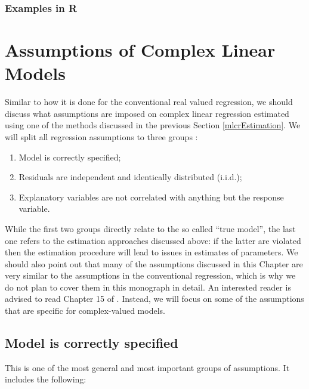 \documentclass[
]{book}
\providecommand{\tightlist}{%
  \setlength{\itemsep}{0pt}\setlength{\parskip}{0pt}}
\begin{document}
\hypertarget{examples-in-r-3}{%
\subsection{Examples in R}\label{examples-in-r-3}}

\hypertarget{assumptions-of-complex-linear-models}{%
\chapter{Assumptions of Complex Linear Models}\label{assumptions-of-complex-linear-models}}

Similar to how it is done for the conventional real valued regression, we should discuss what assumptions are imposed on complex linear regression estimated using one of the methods discussed in the previous Section \ref{mlcrEstimation}. We will split all regression assumptions to three groups \citep[similar to how it was done by][]{SvetunkovSBA}:

\begin{enumerate}
\def\labelenumi{\arabic{enumi}.}
\tightlist
\item
  Model is correctly specified;
\item
  Residuals are independent and identically distributed (i.i.d.);
\item
  Explanatory variables are not correlated with anything but the response variable.
\end{enumerate}

While the first two groups directly relate to the so called ``true model'', the last one refers to the estimation approaches discussed above: if the latter are violated then the estimation procedure will lead to issues in estimates of parameters. We should also point out that many of the assumptions discussed in this Chapter are very similar to the assumptions in the conventional regression, which is why we do not plan to cover them in this monograph in detail. An interested reader is advised to read Chapter 15 of \citet{SvetunkovSBA}. Instead, we will focus on some of the assumptions that are specific for complex-valued models.

\hypertarget{model-is-correctly-specified}{%
\section{Model is correctly specified}\label{model-is-correctly-specified}}

This is one of the most general and most important groups of assumptions. It includes the following:
\end{document}
